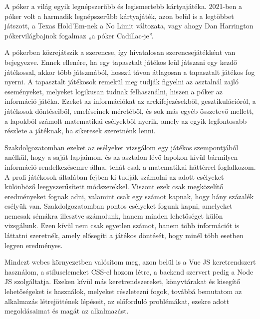 
A póker a világ egyik legnépszerűbb és legismertebb kártyajátéka. 2021-ben a póker volt a harmadik legnépszerűbb kártyajáték, azon belül is a legtöbbet játszott, a \linebreak Texas Hold’Em-nek a No Limit változata, vagy ahogy Dan Harrington pókervilágbajnok fogalmaz „a póker Cadillac-je”\cite{harrington}. 

A pókerben közrejátszik a szerencse, így hivatalosan szerencsejátékként van bejegyezve. Ennek ellenére, ha egy tapasztalt játékos leül játszani egy kezdő játékossal, akkor több játszmából, hosszú távon átlagosan a tapasztalt játékos fog nyerni. A tapasztalt játékosok remekül meg tudják figyelni az asztalnál zajló eseményeket, melyeket logikusan tudnak felhasználni, hiszen a póker az információ játéka. Ezeket az információkat az arckifejezésekből, gesztikulációról, a játékosok döntéseiből, emeléseinek méretéből, és sok más egyéb összetevő mellett, a lapokból számolt matematikai esélyekből nyerik, amely az egyik legfontosabb részlete a játéknak, ha sikeresek szeretnénk lenni.

Szakdolgozatomban ezeket az esélyeket vizsgálom egy játékos szempontjából anélkül, hogy a saját lapjaimon, és az asztalon lévő lapokon kívül bármilyen információ rendelkezésemre állna, tehát csak a matematikai háttérrel foglalkozom. A profi játékosok általában fejben ki tudják számolni az adott esélyeket különböző leegyszerűsített módszerekkel. Viszont ezek csak megközelítő eredményeket fognak adni, valamint csak egy számot kapnak, hogy hány százalék esélyük van. Szakdolgozatomban pontos esélyeket fogunk kapni, amelyeket nemcsak sémákra illesztve számolunk, hanem minden lehetőséget külön vizsgálunk. Ezen kívül nem csak egyetlen számot, hanem több információt is láttatni szeretnék, amely elősegíti a játékos döntését, hogy minél több esetben legyen eredményes.

Mindezt webes környezetben valósítom meg, azon belül is a Vue JS keretrendszert használom, a stíluselemeket CSS-el hozom létre, a backend szervert pedig a Node JS szolgáltatja. Ezeken kívül más keretrendszereket, könyvtárakat és kisegítő lehetőségeket is használok, melyeket részletezni fogok, továbbá bemutatom az alkalmazás létrejöttének lépéseit, az előforduló problémákat, ezekre adott megoldásaimat és magát az alkalmazást.